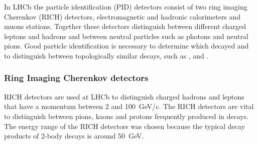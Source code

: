 In LHCb the particle identification (PID) detectors consist of two ring imaging Cherenkov (RICH) detectors, electromagnetic and hadronic calorimeters and muons stations. Together these detectors distinguish between different charged leptons and hadrons and between neutral particles such as photons and neutral pions. Good particle identification is necessary to determine which \bhadron decayed and to distinguish between topologically similar decays, such as \bdkpi, \bskk and \bmumu. %



\subsubsection{Ring Imaging Cherenkov detectors}
\label{RICH}

RICH detectors are used at LHCb to distinguish charged hadrons and leptons that have a momentum between 2 and 100~GeV/c. The RICH detectors are vital to distinguish between pions, kaons and protons frequently produced in \bhadron decays. %
The energy range of the RICH detectors was chosen because the typical decay products of 2-body \bhadron decays is around 50~GeV. 



